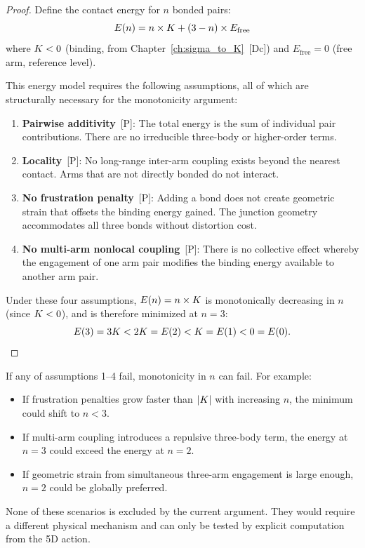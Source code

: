 \begin{proof}
Define the contact energy for $n$ bonded pairs:
\begin{equation}
    E(n) = n \times K + (3 - n) \times E_{\text{free}}
    \label{eq:contact_energy}
\end{equation}
where $K < 0$ (binding, from Chapter~\ref{ch:sigma_to_K}~[Dc]) and
$E_{\text{free}} = 0$ (free arm, reference level).

This energy model requires the following assumptions, all of which are
structurally necessary for the monotonicity argument:

\begin{enumerate}
    \item \textbf{Pairwise additivity}~[P]: The total energy is the sum of
          individual pair contributions. There are no irreducible three-body
          or higher-order terms.
    \item \textbf{Locality}~[P]: No long-range inter-arm coupling exists
          beyond the nearest contact. Arms that are not directly bonded do
          not interact.
    \item \textbf{No frustration penalty}~[P]: Adding a bond does not
          create geometric strain that offsets the binding energy gained.
          The junction geometry accommodates all three bonds without
          distortion cost.
    \item \textbf{No multi-arm nonlocal coupling}~[P]: There is no
          collective effect whereby the engagement of one arm pair modifies
          the binding energy available to another arm pair.
\end{enumerate}

Under these four assumptions, $E(n) = n \times K$ is monotonically
decreasing in $n$ (since $K < 0$), and is therefore minimized at
$n = 3$:
\begin{equation}
    E(3) = 3K < 2K = E(2) < K = E(1) < 0 = E(0).
    \label{eq:monotonic}
\end{equation}
\end{proof}

\begin{remark}
\label{rem:failure_modes}
If any of assumptions 1--4 fail, monotonicity in $n$ can fail. For example:
\begin{itemize}
    \item If frustration penalties grow faster than $|K|$ with increasing
          $n$, the minimum could shift to $n < 3$.
    \item If multi-arm coupling introduces a repulsive three-body term, the
          energy at $n = 3$ could exceed the energy at $n = 2$.
    \item If geometric strain from simultaneous three-arm engagement is
          large enough, $n = 2$ could be globally preferred.
\end{itemize}
None of these scenarios is excluded by the current argument. They would
require a different physical mechanism and can only be tested by explicit
computation from the 5D action.
\end{remark}

